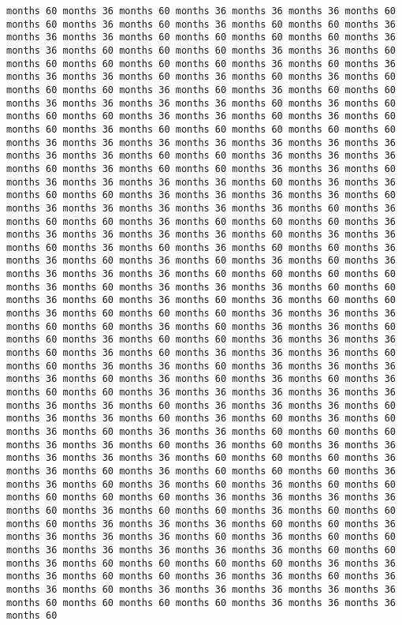 \documentclass[11pt]{article}
\begin{document}
\begin{Verbatim}[commandchars=\\\{\}, frame=single, framerule=2mm, rulecolor=\color{outerrorbackground}]
months 60 months 36 months 60 months 36 months 36 months 36 months 60 months 60 months 36 months 60 months 36 months 60 months 60 months 36 months 36 months 36 months 60 months 60 months 60 months 60 months 36 months 36 months 60 months 60 months 60 months 36 months 36 months 60 months 60 months 60 months 60 months 60 months 36 months 60 months 36 months 36 months 36 months 60 months 36 months 60 months 36 months 60 months 60 months 60 months 36 months 60 months 36 months 60 months 60 months 36 months 36 months 36 months 36 months 60 months 36 months 60 months 60 months 60 months 36 months 36 months 60 months 36 months 60 months 60 months 36 months 60 months 60 months 60 months 60 months 60 months 36 months 36 months 36 months 36 months 36 months 36 months 36 months 36 months 36 months 60 months 60 months 36 months 36 months 36 months 60 months 36 months 60 months 60 months 36 months 36 months 60 months 36 months 36 months 36 months 36 months 60 months 36 months 36 months 60 months 60 months 36 months 36 months 36 months 36 months 60 months 36 months 36 months 36 months 36 months 36 months 60 months 36 months 60 months 60 months 36 months 60 months 60 months 60 months 36 months 36 months 36 months 36 months 36 months 60 months 36 months 36 months 60 months 36 months 60 months 36 months 60 months 60 months 36 months 36 months 60 months 36 months 60 months 36 months 60 months 36 months 36 months 36 months 36 months 60 months 60 months 60 months 60 months 36 months 60 months 36 months 36 months 36 months 60 months 60 months 36 months 60 months 36 months 60 months 36 months 60 months 60 months 36 months 60 months 60 months 60 months 36 months 36 months 36 months 60 months 60 months 36 months 60 months 36 months 36 months 60 months 60 months 36 months 60 months 60 months 36 months 36 months 36 months 60 months 36 months 60 months 36 months 36 months 36 months 60 months 60 months 36 months 36 months 60 months 36 months 36 months 36 months 36 months 60 months 36 months 60 months 36 months 60 months 36 months 60 months 60 months 36 months 36 months 36 months 36 months 36 months 36 months 36 months 60 months 36 months 36 months 36 months 60 months 36 months 36 months 60 months 36 months 60 months 36 months 60 months 36 months 60 months 36 months 36 months 60 months 60 months 60 months 36 months 36 months 60 months 36 months 60 months 36 months 36 months 36 months 36 months 36 months 60 months 60 months 60 months 36 months 36 months 60 months 36 months 60 months 60 months 60 months 36 months 36 months 60 months 36 months 60 months 36 months 60 months 60 months 60 months 60 months 60 months 36 months 36 months 36 months 36 months 60 months 36 months 60 months 60 months 36 months 60 months 60 months 60 months 36 months 36 months 36 months 60 months 60 months 36 months 36 months 36 months 36 months 60 months 36 months 60 months 60 months 36 months 36 months 36 months 36 months 36 months 60 months 60 months 36 months 60 months 60 months 60 months 60 months 36 months 36 months 36 months 60 months 60 months 36 months 36 months 60 months 36 months 36 months 60 months 36 months 36 months 36 months 36 months 36 months 60 months 60 months 60 months 60 months 36 months 36 months 36 months 60 
\end{Verbatim}
\end{document}
